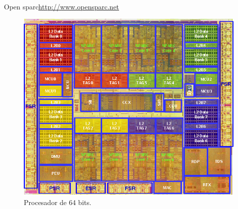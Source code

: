 \documentclass{beamer}
\begin{document}
\begin{frame}{Open sparc}{\url{http://www.opensparc.net}}
  \begin{figure}
    \includegraphics[scale=0.4]{img/ultrasparc-t2-layout}
    \caption{Procesador de 64 bits.}
    \label{fig:opensparc}
  \end{figure}
\end{frame}
\end{document}
